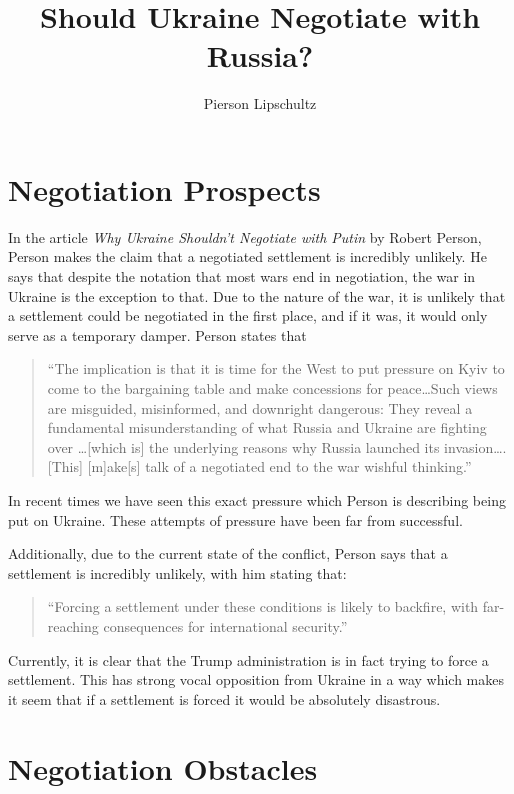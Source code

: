 \documentclass{article}
\title{Should Ukraine Negotiate with Russia?}
\author{Pierson Lipschultz}
\begin{document}
\maketitle

\section{Negotiation Prospects}
    In the article \textit{Why Ukraine Shouldn't Negotiate with Putin} by Robert Person, Person makes the claim that a negotiated settlement is incredibly unlikely. He says that despite the notation that most wars end in negotiation, the war in Ukraine is the exception to that. Due to the nature of the war, it is unlikely that a settlement could be negotiated in the first place, and if it was, it would only serve as a temporary damper. Person states that

    \begin{quote}
       ``The implication is that it is time for the West to put pressure on Kyiv to come to the bargaining table and make concessions for peace\ldots Such views are misguided, misinformed, and downright dangerous: They reveal a fundamental misunderstanding of what Russia and Ukraine are fighting over \ldots [which is] the underlying reasons why Russia launched its invasion\ldots. [This] [m]ake[s] talk of a negotiated end to the war wishful thinking.'' \parencite{person_2025}
    \end{quote}
    In recent times we have seen this exact pressure which Person is describing being put on Ukraine. These attempts of pressure have been far from successful. 

    Additionally, due to the current state of the conflict, Person says that a settlement is incredibly unlikely, with him stating that:

    \begin{quote}
        ``Forcing a settlement under these conditions is likely to backfire, with far-reaching consequences for international security.'' \parencite{person_2025}
    \end{quote}
    
    Currently, it is clear that the Trump administration is in fact trying to force a settlement. This has strong vocal opposition from Ukraine in a way which makes it seem that if a settlement is forced it would be absolutely disastrous. 

\section{Negotiation Obstacles}
\end{document}
